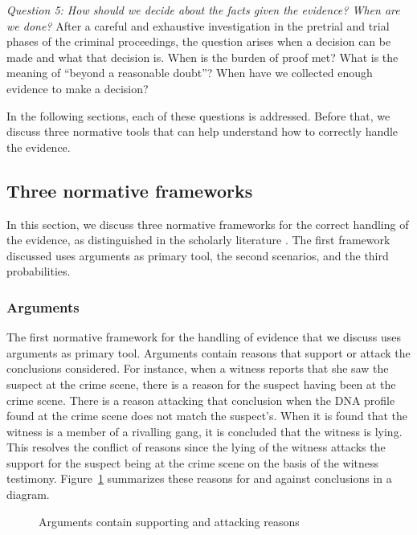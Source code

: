 \documentclass[10pt]{article}
\begin{document}
\textit{Question 5:	How should we decide about the facts given the evidence? When are we done?}
After a careful and exhaustive investigation in the pretrial and trial phases of the criminal proceedings, the question arises when a decision can be made and what that decision is. When is the burden of proof met? What is the meaning of ``beyond a reasonable doubt''? When have we collected enough evidence to make a decision?

In the following sections, each of these questions is addressed. Before that, we discuss three normative tools that can help understand how to correctly handle the evidence. 

\subsection{Three normative frameworks}

In this section, we discuss three normative frameworks for the correct handling of the evidence, as distinguished in the scholarly literature \citep{andersonEtal2005,kapteinEtal2009,dawidEtal2011}. The first framework discussed uses arguments as primary tool, the second scenarios, and the third probabilities. 

\subsubsection{Arguments}

The first normative framework for the handling of evidence that we discuss uses arguments as primary tool. Arguments contain reasons that support or attack the conclusions considered. For instance, when a witness reports that she saw the suspect at the crime scene, there is a reason for the suspect having been at the crime scene. There is a reason attacking that conclusion when the DNA profile found at the crime scene does not match the suspect's. When it is found that the witness is a member of a rivalling gang, it is concluded that the witness is lying. This resolves the conflict of reasons since the lying of the witness attacks the support for the suspect being at the crime scene on the basis of the witness testimony. Figure~\ref{fig:arg} summarizes these reasons for and against conclusions in a diagram. 

\begin{figure}[bt]
\centering

\caption{Arguments contain supporting and attacking reasons\label{fig:arg}}
\end{figure}
\end{document}
